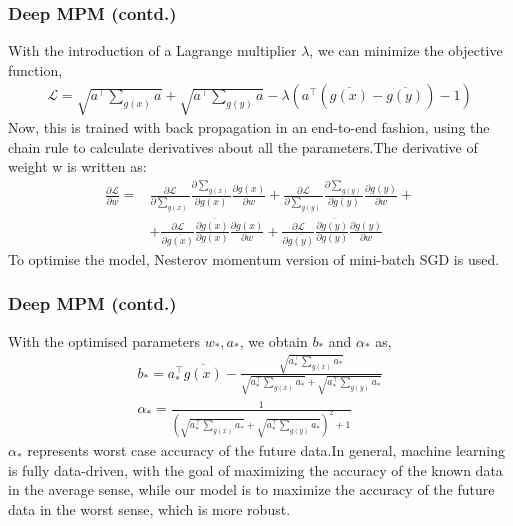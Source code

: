 \documentclass{beamer}
\newcommand{\Lagr}{\mathcal{L}}
\begin{document}
\begin{frame}[fragile]
\frametitle{Deep MPM (contd.)}
With the introduction of a Lagrange multiplier $\lambda$, we can minimize the objective function,
\begin{align}
    \Lagr=\sqrt{a^{\top}\textstyle \sum_{g(x)} a}+\sqrt{a^{\top}\textstyle \sum_{g(y)} a}-\lambda(a^{\top}(\overline{g(x)}-\overline{g(y)})-1)
\end{align}
Now, this is trained with back propagation in an end-to-end fashion, using the chain rule to calculate derivatives about all the parameters.The derivative of weight w is written as:
\begin{align}
    \frac{\partial \Lagr}{\partial w} = &\frac{\partial \Lagr}{\partial \textstyle \sum_{g(x)}}\frac{\partial \textstyle \sum_{g(x)}}{\partial g(x)}\frac{\partial g(x)}{\partial w}+\frac{\partial \Lagr}{\partial \textstyle \sum_{g(y)}}\frac{\partial \textstyle \sum_{g(y)}}{\partial g(y)}\frac{\partial g(y)}{\partial w}+ \nonumber\\
    & + \frac{\partial \Lagr}{\partial \overline{g(x)}}\frac{\partial \overline{g(x)}}{\partial g(x)}\frac{\partial g(x)}{\partial w}+\frac{\partial \Lagr}{\partial \overline{g(y)}}\frac{\partial \overline{g(y)}}{\partial g(y)}\frac{\partial g(y)}{\partial w}
\end{align}
To optimise the model, Nesterov momentum version of mini-batch
SGD is used.

\end{frame}
\begin{frame}[fragile]
\frametitle{Deep MPM (contd.)}
With the optimised parameters $w_{*}, a_{*}$, we obtain $b_{*}$ and $\alpha_{*}$ as,
\begin{align}
    b_{*}=a_{*}^{\top}\overline{g(x)}-\frac{\sqrt{a_{*}^{\top}\textstyle \sum_{g(x)} a_{*}}}{\sqrt{a_{*}^{\top}\textstyle \sum_{g(x)} a_{*}}+\sqrt{a_{*}^{\top}\textstyle \sum_{g(y)} a_{*}}}\\
    \alpha_{*}=\frac{1}{(\sqrt{a_{*}^{\top}\textstyle \sum_{g(x)} a_{*}}+\sqrt{a_{*}^{\top}\textstyle \sum_{g(y)} a_{*}})^2+1}
\end{align}
$\alpha_{*}$ represents worst case accuracy of the future data.In
general, machine learning is fully data-driven, with
the goal of maximizing the accuracy of the known data in the
average sense, while our model is to maximize the accuracy
of the future data in the worst sense, which is more robust.
\end{frame}
\end{document}
